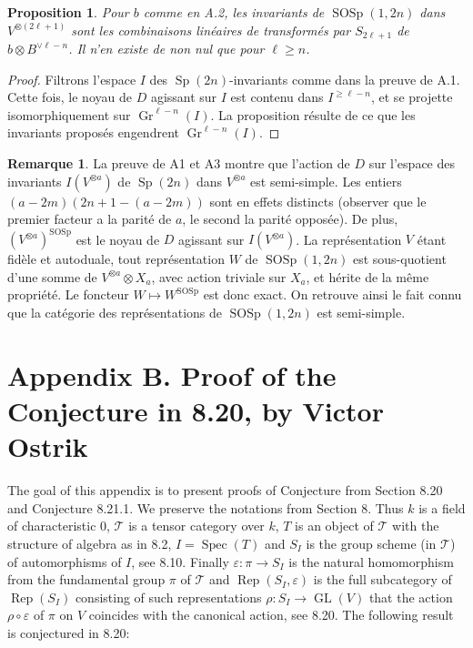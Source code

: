 \documentclass[11pt,a4paper]{article}
\theoremstyle{plain}
\newtheorem{proposition}[theorem]{Proposition}
\theoremstyle{definition}
\newtheorem{remark}[theorem]{Remarque}
\DeclareMathOperator{\Spec}{Spec}
\DeclareMathOperator{\Rep}{Rep}
\DeclareMathOperator{\GL}{GL}
\DeclareMathOperator{\Sp}{Sp}
\DeclareMathOperator{\SOSp}{SOSp}
\newcommand{\eps}{\varepsilon}
\DeclareMathOperator{\Gr}{Gr}
\begin{document}
\begin{proposition}
Pour $b$ comme en A.2, les invariants de $\SOSp(1, 2n)$ dans $V^{\otimes (2\ell+1)}$ sont les combinaisons lin\'eaires de transform\'es par $S_{2\ell+1}$ de $b \otimes B^{\vee \ell-n}$. Il n'en existe de non nul que pour $\ell \geq n$.
\end{proposition}

\begin{proof}
Filtrons l'espace $I$ des $\Sp(2n)$-invariants comme dans la preuve de A.1. Cette fois, le noyau de $D$ agissant sur $I$ est contenu dans $I^{\geq \ell-n}$, et se projette isomorphiquement sur $\Gr^{\ell-n}(I)$. La proposition r\'esulte de ce que les invariants propos\'es engendrent $\Gr^{\ell-n}(I)$.
\end{proof}

\begin{remark}
La preuve de A1 et A3 montre que l'action de $D$ sur l'espace des invariants $I(V^{\otimes a})$ de $\Sp(2n)$ dans $V^{\otimes a}$ est semi-simple. Les entiers $(a - 2m)(2n + 1 - (a - 2m))$ sont en effets distincts (observer que le premier facteur a la parit\'e de $a$, le second la parit\'e oppos\'ee). De plus, $(V^{\otimes a})^{\SOSp}$ est le noyau de $D$ agissant sur $I(V^{\otimes a})$. La repr\'esentation $V$ \'etant fid\`ele et autoduale, tout repr\'esentation $W$ de $\SOSp(1, 2n)$ est sous-quotient d'une somme de $V^{\otimes a} \otimes X_a$, avec action triviale sur $X_a$, et h\'erite de la m\^eme propri\'et\'e. Le foncteur $W \mapsto W^{\SOSp}$ est donc exact. On retrouve ainsi le fait connu que la cat\'egorie des repr\'esentations de $\SOSp(1, 2n)$ est semi-simple.
\end{remark}


\section*{Appendix B. Proof of the Conjecture in 8.20, by Victor Ostrik}

The goal of this appendix is to present proofs of Conjecture from Section 8.20 and Conjecture 8.21.1. We preserve the notations from Section 8. Thus $k$ is a field of characteristic $0$, $\mathcal{T}$ is a tensor category over $k$, $T$ is an object of $\mathcal{T}$ with the structure of algebra as in 8.2, $I = \Spec(T)$ and $S_I$ is the group scheme (in $\mathcal{T}$) of automorphisms of $I$, see 8.10. Finally $\eps : \pi \to S_I$ is the natural homomorphism from the fundamental group $\pi$ of $\mathcal{T}$ and $\Rep(S_I, \eps)$ is the full subcategory of $\Rep(S_I)$ consisting of such representations $\rho : S_I \to \GL(V)$ that the action $\rho \circ \eps$ of $\pi$ on $V$ coincides with the canonical action, see 8.20. The following result is conjectured in 8.20:
\end{document}
